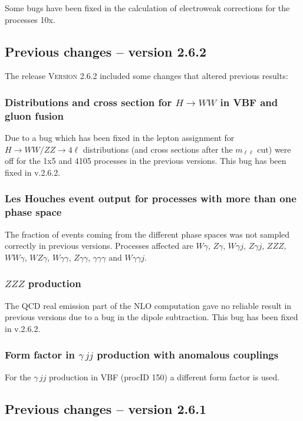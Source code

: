 \documentclass[english,12pt]{article}
\begin{document}
Some bugs have been fixed in the calculation of electroweak corrections for the processes 10x.


\subsection{Previous changes -- version 2.6.2}

The release \textsc{Version 2.6.2} included some changes that altered previous results:

\subsubsection{Distributions and cross section for $H\to WW$ in VBF and gluon fusion}

Due to a bug which has been fixed in the lepton assignment for $H\to WW/ZZ \to 4\ell$ distributions
(and cross sections after the $m_{\ell\ell}$ cut) were off for the 1x5 and 4105 processes
in the previous versions. This bug has been fixed in v.2.6.2.

\subsubsection{Les Houches event output for processes with more than one phase space}

The fraction of events coming from the different phase spaces was not sampled correctly 
in previous versions. Processes affected are $W\gamma$, $Z\gamma$, $W\gamma j$,
$Z\gamma j$, $ZZZ$, $WW\gamma$, $WZ\gamma$, $W\gamma\gamma$, $Z\gamma\gamma$,
$\gamma\gamma\gamma$ and $W\gamma\gamma j$.

\subsubsection{$ZZZ$ production}

The QCD real emission part of the NLO computation gave no reliable result in previous versions
due to a bug in the dipole subtraction. This bug has been fixed in v.2.6.2.

\subsubsection{Form factor in $\gamma\,jj$ production with anomalous couplings}

 For the $\gamma\,jj$ production in VBF (procID 150) a different form factor is used.


\subsection{Previous changes -- version 2.6.1}
\end{document}
